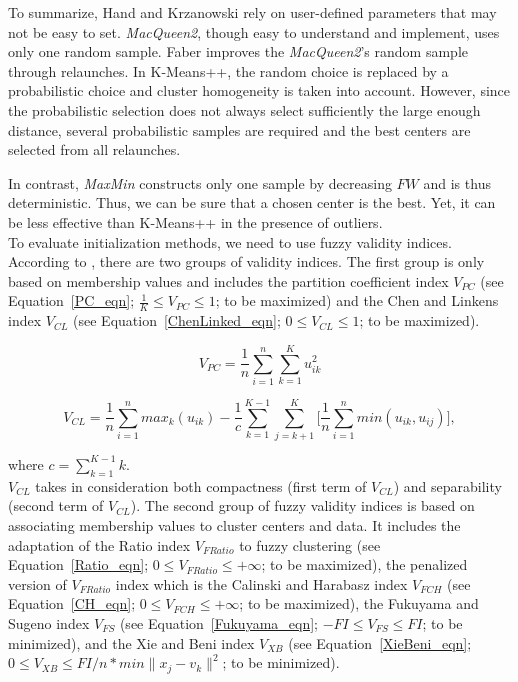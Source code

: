 \documentclass[runningheads,a4paper]{llncs}
\begin{document}
To summarize, Hand and Krzanowski \cite{hand2005optimising} rely on user-defined parameters that may not be easy to set. \textit{MacQueen2}, though easy to understand and implement, uses only one random sample. Faber improves the \textit{MacQueen2}'s random sample through relaunches. In K-Means++, the random choice is replaced by a probabilistic choice and cluster homogeneity is taken into account. However, since the probabilistic selection does not always select sufficiently the large enough distance, several probabilistic samples are required and the best centers are selected from all relaunches. 

In contrast, \textit{MaxMin} constructs only one sample by decreasing $FW$ and is thus deterministic. Thus, we can be sure that a chosen center is the best. Yet, it can be less effective than K-Means++ in the presence of outliers. \\

To evaluate initialization methods, we need to use fuzzy validity indices. According to  \cite{wang2007fuzzy}, there are two groups of validity indices. The first group is only based  on membership values and includes the partition coefficient index $V_{PC}$  \cite{bezdek1973cluster} (see Equation~\ref{PC_eqn}; $\frac{1}{K} \leq V_{PC} \leq 1$; to be maximized) and the Chen and Linkens index $V_{CL}$ \cite{chen2001rule} (see Equation~\ref{ChenLinked_eqn}; $0 \leq V_{CL} \leq 1$; to be maximized). 

\begin{equation} \label{PC_eqn}
V_{PC}= \frac{1}{n} \sum_{i=1}^n \sum_{k=1}^K u_{ik}^2
\end{equation} 

\begin{equation} \label{ChenLinked_eqn}
V_{CL} = \frac{1}{n} \sum_{i=1}^n max_{k}(u_{ik}) - \frac{1}{c} 
\sum_{k=1}^{K-1} \sum_{j=k+1}^K \Bigg[\frac{1}{n} \sum_{i=1}^n min(u_{ik}, u_{ij})\Bigg],
\end{equation}

where $c = \sum_{k=1}^{K-1}k $. \\

$V_{CL}$ takes in consideration both compactness (first term of $V_{CL}$) and separability (second term of $V_{CL}$). The second group of fuzzy validity indices is based on associating membership values to cluster centers and data. It includes the adaptation of the Ratio index $V_{FRatio}$ to fuzzy clustering \cite{calinski1974dendrite} (see Equation~\ref{Ratio_eqn}; $0 \leq V_{FRatio} \leq +\infty$; to be maximized), the penalized version of $V_{FRatio}$ index which is the Calinski and Harabasz index $V_{FCH}$ \cite{calinski1974dendrite} (see Equation~\ref{CH_eqn}; $0 \leq V_{FCH} \leq +\infty$; to be maximized), the Fukuyama and Sugeno index $V_{FS}$ \cite{fukuyama1989new} (see Equation~\ref{Fukuyama_eqn}; $-FI \leq V_{FS} \leq FI$; to be minimized), and the Xie and Beni index $V_{XB}$ \cite{xie1991validity,pal1995cluster} (see Equation~\ref{XieBeni_eqn}; $0 \leq V_{XB} \leq FI/n*min\|x_j - v_k\|^2 $; to be minimized).
 
\end{document}
